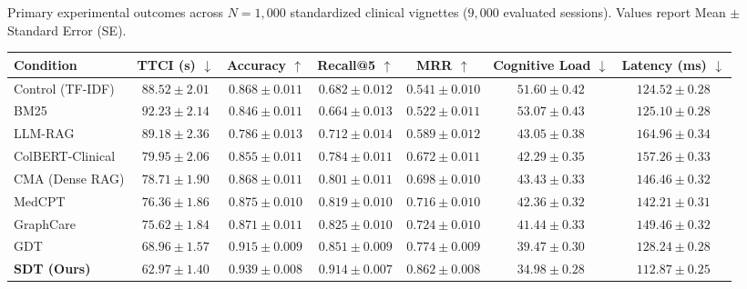 \documentclass[ijds,dblanonrev]{informs4}
\begin{document}
\begin{table}[t]
\TABLE
{Primary experimental outcomes across $N=1{,}000$ standardized clinical vignettes ($9{,}000$ evaluated sessions). Values report Mean $\pm$ Standard Error (SE).\label{tab:primary_results}}
{\footnotesize
\begin{tabular}{lcccccc}
\toprule
\textbf{Condition} & \textbf{TTCI (s)} $\downarrow$ & \textbf{Accuracy} $\uparrow$ & \textbf{Recall@5} $\uparrow$ & \textbf{MRR} $\uparrow$ & \textbf{Cognitive Load} $\downarrow$ & \textbf{Latency (ms)} $\downarrow$ \\
\midrule
Control (TF-IDF)  & $88.52 \pm 2.01$ & $0.868 \pm 0.011$ & $0.682 \pm 0.012$ & $0.541 \pm 0.010$ & $51.60 \pm 0.42$ & $124.52 \pm 0.28$ \\
BM25              & $92.23 \pm 2.14$ & $0.846 \pm 0.011$ & $0.664 \pm 0.013$ & $0.522 \pm 0.011$ & $53.07 \pm 0.43$ & $125.10 \pm 0.28$ \\
LLM-RAG           & $89.18 \pm 2.36$ & $0.786 \pm 0.013$ & $0.712 \pm 0.014$ & $0.589 \pm 0.012$ & $43.05 \pm 0.38$ & $164.96 \pm 0.34$ \\
ColBERT-Clinical  & $79.95 \pm 2.06$ & $0.855 \pm 0.011$ & $0.784 \pm 0.011$ & $0.672 \pm 0.011$ & $42.29 \pm 0.35$ & $157.26 \pm 0.33$ \\
CMA (Dense RAG)   & $78.71 \pm 1.90$ & $0.868 \pm 0.011$ & $0.801 \pm 0.011$ & $0.698 \pm 0.010$ & $43.43 \pm 0.33$ & $146.46 \pm 0.32$ \\
MedCPT            & $76.36 \pm 1.86$ & $0.875 \pm 0.010$ & $0.819 \pm 0.010$ & $0.716 \pm 0.010$ & $42.36 \pm 0.32$ & $142.21 \pm 0.31$ \\
GraphCare         & $75.62 \pm 1.84$ & $0.871 \pm 0.011$ & $0.825 \pm 0.010$ & $0.724 \pm 0.010$ & $41.44 \pm 0.33$ & $149.46 \pm 0.32$ \\
GDT               & $68.96 \pm 1.57$ & $0.915 \pm 0.009$ & $0.851 \pm 0.009$ & $0.774 \pm 0.009$ & $39.47 \pm 0.30$ & $128.24 \pm 0.28$ \\
\midrule
\textbf{SDT (Ours)} & $\mathbf{62.97 \pm 1.40}$ & $\mathbf{0.939 \pm 0.008}$ & $\mathbf{0.914 \pm 0.007}$ & $\mathbf{0.862 \pm 0.008}$ & $\mathbf{34.98 \pm 0.28}$ & $\mathbf{112.87 \pm 0.25}$ \\
\bottomrule
\end{tabular}
}
{}
\end{table}
\end{document}
